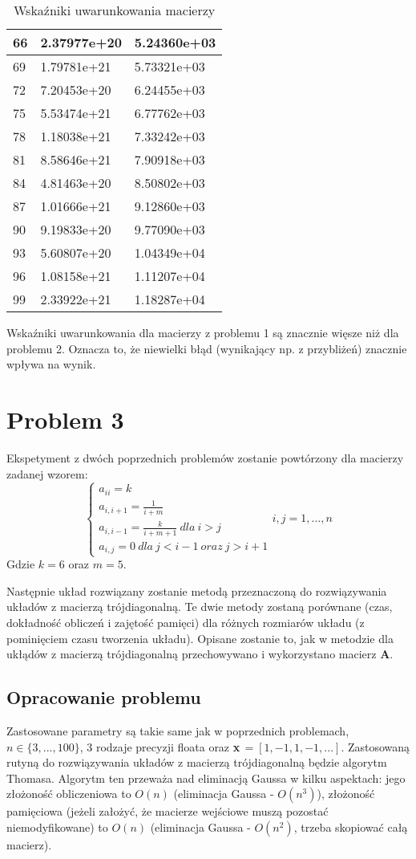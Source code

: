 \documentclass{article}
\begin{document}
\begin{table}[H]
\begin{tabular}{|l|l|l|}
66 & 2.37977e+20 & 5.24360e+03 \\ \hline
69 & 1.79781e+21 & 5.73321e+03 \\ \hline
72 & 7.20453e+20 & 6.24455e+03 \\ \hline
75 & 5.53474e+21 & 6.77762e+03 \\ \hline
78 & 1.18038e+21 & 7.33242e+03 \\ \hline
81 & 8.58646e+21 & 7.90918e+03 \\ \hline
84 & 4.81463e+20 & 8.50802e+03 \\ \hline
87 & 1.01666e+21 & 9.12860e+03 \\ \hline
90 & 9.19833e+20 & 9.77090e+03 \\ \hline
93 & 5.60807e+20 & 1.04349e+04 \\ \hline
96 & 1.08158e+21 & 1.11207e+04 \\ \hline
99 & 2.33922e+21 & 1.18287e+04 \\ \hline
\end{tabular}
\caption{Wskaźniki uwarunkowania macierzy}
\end{table}

Wskaźniki uwarunkowania dla macierzy z problemu 1 są znacznie więsze niż dla problemu 2.
Oznacza to, że niewielki błąd (wynikający np. z przybliżeń) znacznie wpływa na wynik.

\section{Problem 3}
Ekspetyment z dwóch poprzednich problemów zostanie powtórzony dla macierzy zadanej wzorem:
$$
\begin{cases}
    a_{ii}=k\\
    a_{i,i+1}=\frac{1}{i+m}\\
    a_{i,i-1}=\frac{k}{i+m+1} \ dla \ i > j\\
    a_{i,j}=0 \ dla \ j<i-1 \ oraz \ j>i+1
\end{cases}i,j=1,...,n
$$
Gdzie $k=6$ oraz $m=5$.

Następnie układ rozwiązany zostanie metodą przeznaczoną do rozwiązywania układów z macierzą trójdiagonalną. Te dwie metody
zostaną porównane (czas, dokładność obliczeń i zajętość pamięci) dla różnych rozmiarów układu (z pominięciem czasu tworzenia
układu). Opisane zostanie to, jak w metodzie dla ukłądów z macierzą trójdiagonalną przechowywano i wykorzystano macierz \textbf{A}.

\subsection{Opracowanie problemu}
Zastosowane parametry są takie same jak w poprzednich problemach, $n\in\{3,...,100\}$, 3 rodzaje precyzji floata oraz 
\textbf{x}\,$=[1,-1,1,-1,...]$. Zastosowaną rutyną do rozwiązywania układów z macierzą trójdiagonalną będzie algorytm 
Thomasa. Algorytm ten przeważa nad eliminacją Gaussa w kilku aspektach: jego złożoność obliczeniowa to $O(n)$ (eliminacja
Gaussa - $O(n^3)$), złożoność pamięciowa (jeżeli założyć, że macierze wejściowe muszą pozostać niemodyfikowane) to 
$O(n)$ (eliminacja Gaussa - $O(n^2)$, trzeba skopiować całą macierz).
\end{document}

